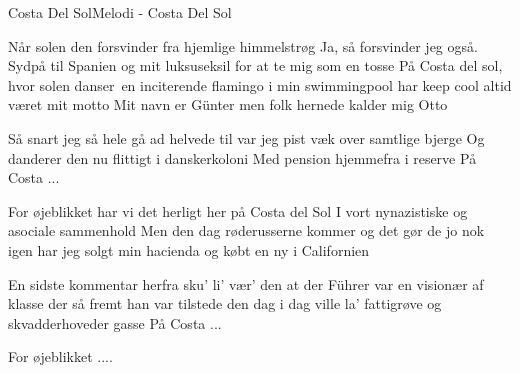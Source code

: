 \begin{sang}{Costa Del Sol}{Melodi - Costa Del Sol}
\begin{vers}
Når solen den forsvinder
fra hjemlige himmelstrøg
Ja, så forsvinder jeg også.
Sydpå til Spanien og mit luksuseksil
for at te mig som en tosse
På Costa del sol, hvor solen danser\
en inciterende flamingo
i min swimmingpool
har keep cool altid været mit motto
Mit navn er Günter
men folk hernede kalder mig Otto
\end{vers}
\begin{vers}
Så snart jeg så hele gå ad helvede til
var jeg pist væk over samtlige bjerge
Og danderer den nu
flittigt i danskerkoloni
Med pension hjemmefra i reserve
På Costa ...
\end{vers}

\begin{vers}
For øjeblikket har vi det herligt
her på Costa del Sol
I vort nynazistiske
og asociale sammenhold
Men den dag røderusserne kommer
og det gør de jo nok igen
har jeg solgt min hacienda
og købt en ny i Californien
\end{vers}
\begin{vers}
En sidste kommentar herfra
sku' li' vær' den
at der Führer var en visionær af klasse
der så fremt han var tilstede
den dag i dag
ville la' fattigrøve
og skvadderhoveder gasse
På Costa ...
\end{vers}
\begin{vers}
For øjeblikket ....
\end{vers}
\laps
\end{sang}